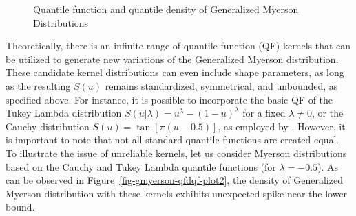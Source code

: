 \documentclass[
  fleqn,
  deca,
  blindrev
]{informs4}
\begin{document}
\begin{figure}


\caption{\label{fig-gmyerson-qfdqf-plot1}Quantile function and quantile
density of Generalized Myerson Distributions}

\end{figure}%

Theoretically, there is an infinite range of quantile function (QF)
kernels that can be utilized to generate new variations of the
Generalized Myerson distribution. These candidate kernel distributions
can even include shape parameters, as long as the resulting \(S(u)\)
remains standardized, symmetrical, and unbounded, as specified above.
For instance, it is possible to incorporate the basic QF of the Tukey
Lambda distribution \(S(u\vert\lambda)=u^\lambda-(1-u)^\lambda\) for a
fixed \(\lambda \neq 0\), or the Cauchy distribution
\(S(u)=\tan[\pi(u-0.5)]\), as employed by
\citep{hadlock2019GeneralizedJohnsonQuantileParameterized}. However, it
is important to note that not all standard quantile functions are
created equal. To illustrate the issue of unreliable kernels, let us
consider Myerson distributions based on the Cauchy and Tukey Lambda
quantile functions (for \(\lambda=-0.5\)). As can be observed in
Figure~\ref{fig-gmyerson-qfdqf-plot2}, the density of Generalized
Myerson distribution with these kernels exhibits unexpected spike near
the lower bound.
\end{document}
